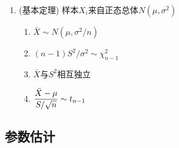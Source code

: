 \begin{enumerate}
\iffalse
\item {\bf $F$分布} $F\sim F_{m,n}$\\
$X\sim\chi_m^2, Y\sim\chi_n^2, F=\D\frac{X/m}{Y/n}$\\
\fbox{$f(x)=\left\{\begin{array}{cl}
\D\frac{\Gamma(\frac{m+n}{2})}{\Gamma(\frac{m}{2})\Gamma(\frac{n}{2})}
\Big(\frac{m}{n}\Big)^{\frac{m}{2}}
x^{\frac{m}{2}-1}
\Big(1+\frac{m}{n}x\Big)^{-\frac{m+n}{2}}
, & x > 0,\\
0, & x \le 0.
\end{array}\right.$}
\begin{enumerate}[label={\sf 性质\arabic*}]
\item $E(F)={n}/{(n-2)}, n > 2;$\\$\D D(F)=\frac{2n^2(m+n-2)}{m(n-2)^2(n-4)}, n>4$
\item $1/F\sim F_{m,n}$
\item 若$X\sim t_n$, 则$X^2\sim F_{1,n}$
\end{enumerate}
\item $F_{m,n}(\alpha)$为$F_{m,n}$分布上的$\alpha$分位点:\\
\colorbox{lightgray}{$P\{F>F_{m,n}(\alpha)\}=\int_{F_{m,n}(\alpha)}^{+\infty}f(x)\d x=\alpha$}
\fi

\item (基本定理) 样本$X_i$来自正态总体$N(\mu,\sigma^2)$
\begin{enumerate}
\item $\bar{X}\sim N (\mu,{\sigma^2}/{n} )$
\item ${(n-1)S^2}/{\sigma^2}\sim\chi_{n-1}^2$
\item $\bar{X}$与$S^2$相互独立
\item $\displaystyle\frac{\bar{X}-\mu}{S/\sqrt{n}}\sim t_{n-1}$
\end{enumerate}

\end{enumerate}

\subsection{参数估计}

